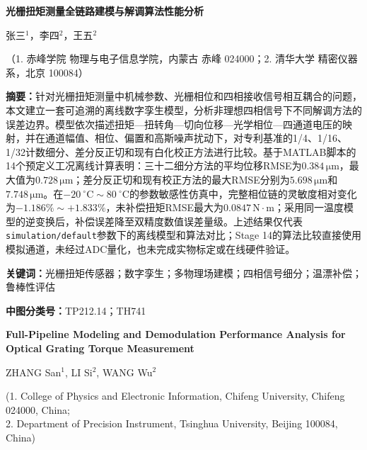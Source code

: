\documentclass[UTF8,a4paper,12pt]{ctexart}
\newcommand{\zhabstract}[1]{%
  \noindent\textbf{摘\quad 要：}#1\par
}
\newcommand{\zhkeywords}[1]{%
  \noindent\textbf{关键词：}#1\par
}
\newcommand{\clc}[1]{%
  \noindent\textbf{中图分类号：}#1\par
}
\begin{document}
\begin{center}
{\heiti{}\textbf{光栅扭矩测量全链路建模与解调算法性能分析}\par}
\vspace{0.8em}

{ 张三$^{1}$，李四$^{2}$，王五$^{2}$\par}
\vspace{0.5em}

{
（1. 赤峰学院 物理与电子信息学院，内蒙古 赤峰 024000；2. 清华大学 精密仪器系，北京 100084）
\par}
\end{center}

\vspace{0.8em}

\zhabstract{针对光栅扭矩测量中机械参数、光栅相位和四相接收信号相互耦合的问题，本文建立一套可追溯的离线数字孪生模型，分析非理想四相信号下不同解调方法的误差边界。模型依次描述扭矩—扭转角—切向位移—光学相位—四通道电压的映射，并在通道幅值、相位、偏置和高斯噪声扰动下，对专利基准的1/4、1/16、1/32计数细分、差分反正切和现有白化校正方法进行比较。基于MATLAB脚本的14个预定义工况离线计算表明：三十二细分方法的平均位移RMSE为$0.384\,\mathrm{\mu m}$，最大值为$0.728\,\mathrm{\mu m}$；差分反正切和现有校正方法的最大RMSE分别为$5.698\,\mathrm{\mu m}$和$7.748\,\mathrm{\mu m}$。在$-20~^\circ\mathrm{C}\sim80~^\circ\mathrm{C}$的参数敏感性仿真中，完整相位链的灵敏度相对变化为$-1.186\%\sim+1.833\%$，未补偿扭矩RMSE最大为$0.0847\,\mathrm{N\cdot m}$；采用同一温度模型的逆变换后，补偿误差降至双精度数值误差量级。上述结果仅代表\texttt{simulation/default}参数下的离线模型和算法对比；Stage 14的算法比较直接使用模拟通道，未经过ADC量化，也未完成实物标定或在线硬件验证。}

\vspace{0.4em}
\zhkeywords{光栅扭矩传感器；数字孪生；多物理场建模；四相信号细分；温漂补偿；鲁棒性评估}
\clc{TP212.14；TH741}

\vspace{1em}

\begin{center}
{\bfseries\large Full-Pipeline Modeling and Demodulation Performance Analysis for Optical Grating Torque Measurement\par}
\vspace{0.6em}
ZHANG San$^{1}$, LI Si$^{2}$, WANG Wu$^{2}$\par
\vspace{0.4em}
\small
(1. College of Physics and Electronic Information, Chifeng University, Chifeng 024000, China;\\
2. Department of Precision Instrument, Tsinghua University, Beijing 100084, China)
\end{center}
\end{document}
